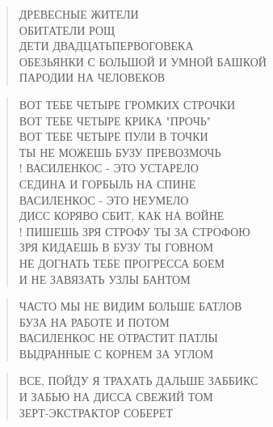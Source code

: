 \poemtitle{***}
\begin{verse}
ДРЕВЕСНЫЕ ЖИТЕЛИ\\
ОБИТАТЕЛИ РОЩ\\
ДЕТИ ДВАДЦАТЬПЕРВОГОВЕКА\\
ОБЕЗЬЯНКИ С БОЛЬШОЙ И УМНОЙ БАШКОЙ\\
ПАРОДИИ НА ЧЕЛОВЕКОВ
\end{verse}

\poemtitle{***}
\begin{verse}
ВОТ ТЕБЕ ЧЕТЫРЕ ГРОМКИХ СТРОЧКИ\\
ВОТ ТЕБЕ ЧЕТЫРЕ КРИКА "ПРОЧЬ"\\
ВОТ ТЕБЕ ЧЕТЫРЕ ПУЛИ В ТОЧКИ\\
ТЫ НЕ МОЖЕШЬ БУЗУ ПРЕВОЗМОЧЬ\\!
ВАСИЛЕНКОС - ЭТО УСТАРЕЛО\\
СЕДИНА И ГОРБЫЛЬ НА СПИНЕ\\
ВАСИЛЕНКОС - ЭТО НЕУМЕЛО\\
ДИСС КОРЯВО СБИТ, КАК НА ВОЙНЕ\\!
ПИШЕШЬ ЗРЯ СТРОФУ ТЫ ЗА СТРОФОЮ\\
ЗРЯ КИДАЕШЬ В БУЗУ ТЫ ГОВНОМ\\
НЕ ДОГНАТЬ ТЕБЕ ПРОГРЕССА БОЕМ\\
И НЕ ЗАВЯЗАТЬ УЗЛЫ БАНТОМ
\end{verse}

\poemtitle{***}
\begin{verse}
ЧАСТО МЫ НЕ ВИДИМ БОЛЬШЕ БАТЛОВ\\
БУЗА НА РАБОТЕ И ПОТОМ\\
ВАСИЛЕНКОС НЕ ОТРАСТИТ ПАТЛЫ\\
ВЫДРАННЫЕ С КОРНЕМ ЗА УГЛОМ
\end{verse}

\poemtitle{***}
\begin{verse}
ВСЕ, ПОЙДУ Я ТРАХАТЬ ДАЛЬШЕ ЗАББИКС\\
И ЗАБЬЮ НА ДИССА СВЕЖИЙ ТОМ\\
ЗЕРТ-ЭКСТРАКТОР СОБЕРЕТ
\end{verse}


